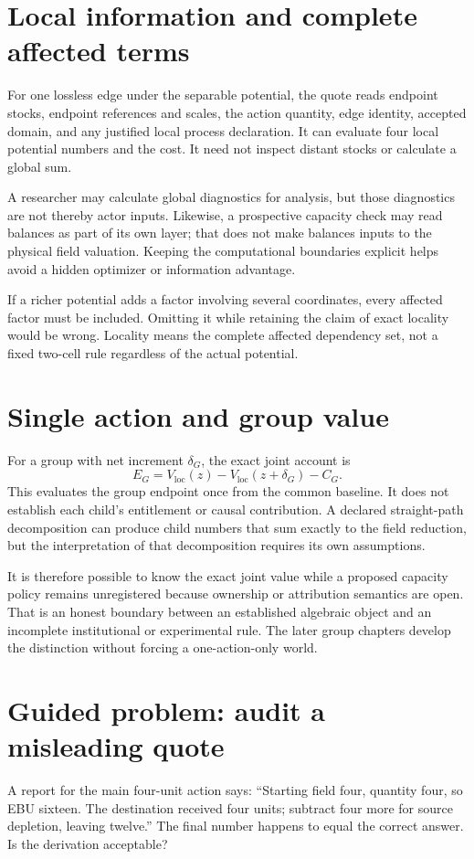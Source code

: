\section{Local information and complete affected terms}
For one lossless edge under the separable potential, the quote reads endpoint stocks, endpoint references and scales, the action quantity, edge identity, accepted domain, and any justified local process declaration. It can evaluate four local potential numbers and the cost. It need not inspect distant stocks or calculate a global sum.

A researcher may calculate global diagnostics for analysis, but those diagnostics are not thereby actor inputs. Likewise, a prospective capacity check may read balances as part of its own layer; that does not make balances inputs to the physical field valuation. Keeping the computational boundaries explicit helps avoid a hidden optimizer or information advantage.

If a richer potential adds a factor involving several coordinates, every affected factor must be included. Omitting it while retaining the claim of exact locality would be wrong. Locality means the complete affected dependency set, not a fixed two-cell rule regardless of the actual potential.

\section{Single action and group value}
For a group with net increment \(\delta_G\), the exact joint account is
\begin{equation}
 E_G=V_{\mathrm{loc}}(z)-V_{\mathrm{loc}}(z+\delta_G)-C_G.
\end{equation}
This evaluates the group endpoint once from the common baseline. It does not establish each child's entitlement or causal contribution. A declared straight-path decomposition can produce child numbers that sum exactly to the field reduction, but the interpretation of that decomposition requires its own assumptions.

It is therefore possible to know the exact joint value while a proposed capacity policy remains unregistered because ownership or attribution semantics are open. That is an honest boundary between an established algebraic object and an incomplete institutional or experimental rule. The later group chapters develop the distinction without forcing a one-action-only world.

\section{Guided problem: audit a misleading quote}
A report for the main four-unit action says: ``Starting field four, quantity four, so EBU sixteen. The destination received four units; subtract four more for source depletion, leaving twelve.'' The final number happens to equal the correct answer. Is the derivation acceptable?

